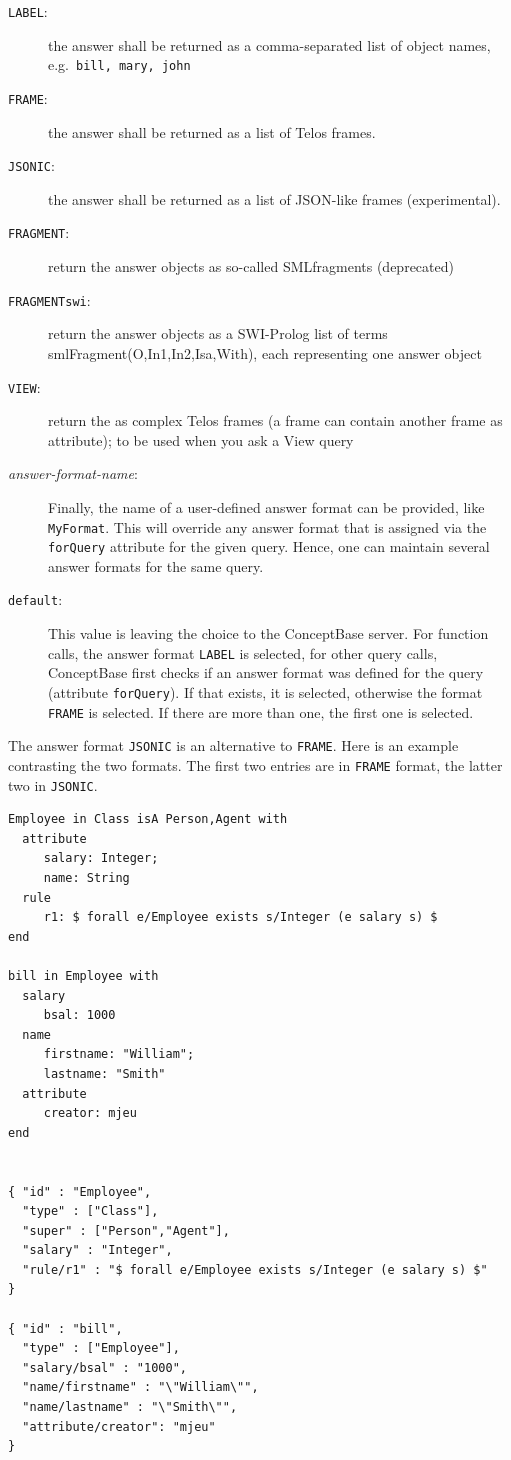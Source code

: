 \begin{description}
\item[{\tt LABEL}:]
      the answer shall be returned as a comma-separated list of object names, e.g.\ 
      {\tt bill, mary, john}
\item[{\tt FRAME}:]
      the answer shall be returned as a list of Telos frames. 
\item[{\tt JSONIC}:]
      the answer shall be returned as a list of JSON-like frames (experimental).
\item[{\tt FRAGMENT}:]
      return the answer objects as so-called SMLfragments (deprecated)
\item[{\tt FRAGMENTswi}:]
      return the answer objects as a SWI-Prolog list of terms
      smlFragment(O,In1,In2,Isa,With), each representing one answer object
\item[{\tt VIEW}:]
      return the as complex Telos frames (a frame can contain another frame as attribute); 
      to be used when you ask a View query
\item[{\em answer-format-name}:]
      Finally, the name of a user-defined answer format can be provided, like {\tt MyFormat}.
      This will override any answer format that is assigned via the {\tt forQuery} attribute
      for the given query. Hence, one can maintain several answer formats for the same query.
\item[{\tt default}:]
      This value is leaving the choice to the ConceptBase server. For function
      calls, the answer format {\tt LABEL} is selected, for other query calls,
      ConceptBase first checks if an answer format was defined for the query (attribute {\tt forQuery}).
      If that exists, it is selected, otherwise the format
      {\tt FRAME} is selected. If there are more than one,
      the first one is selected.
\end{description}

The answer format {\tt JSONIC} is an alternative to {\tt FRAME}. Here is an example contrasting
the two formats. The first two entries are in {\tt FRAME} format, the latter two in {\tt JSONIC}.


\begin{verbatim}
Employee in Class isA Person,Agent with
  attribute
     salary: Integer;
     name: String
  rule
     r1: $ forall e/Employee exists s/Integer (e salary s) $
end

bill in Employee with
  salary
     bsal: 1000
  name
     firstname: "William";
     lastname: "Smith"
  attribute
     creator: mjeu
end


{ "id" : "Employee",
  "type" : ["Class"],
  "super" : ["Person","Agent"],
  "salary" : "Integer",
  "rule/r1" : "$ forall e/Employee exists s/Integer (e salary s) $"
}

{ "id" : "bill",
  "type" : ["Employee"],
  "salary/bsal" : "1000",
  "name/firstname" : "\"William\"",
  "name/lastname" : "\"Smith\"",
  "attribute/creator": "mjeu"
}
\end{verbatim}




